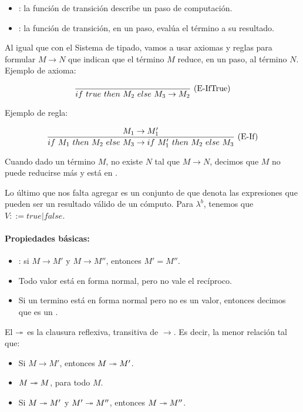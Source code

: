 \begin{itemize}
  \item {}: la función de transición describe un paso de computación.
  \item {}: la función de transición, en un paso, evalúa el término a su resultado.
\end{itemize}

Al igual que con el Sistema de tipado, vamos a usar axiomas y reglas para formular  $M\to N$ que indican que el término $M$ reduce, en un paso, al término $N$. Ejemplo de axioma:

\[\frac{}{if\ true\ then\ M_2\ else\ M_3 \to M_2}\ \text{(E-IfTrue)}\]

Ejemplo de regla:

\[\frac{M_1 \to M_1'}{if\ M_1\ then\ M_2\ else\ M_3 \to if\ M_1'\ then\ M_2\ else\ M_3}\ \text{(E-If)}\]

Cuando dado un término $M$, no existe $N$ tal que $M\to N$, decimos que $M$ no puede reducirse más y está en .

Lo último que nos falta agregar es un conjunto de  que denota las expresiones que pueden ser un resultado válido de un cómputo. Para $\lambda^b$, tenemos que $V ::= true \vert false$.

\paragraph{Propiedades básicas:}

\begin{itemize}
  \item {}: si $M \to M'$ y $M \to M''$, entonces $M'= M''$.
  \item Todo valor está en forma normal, pero no vale el recíproco.
  \item Si un termino está en forma normal pero no es un valor, entonces decimos que es un .
\end{itemize}

\noindent
El  $\twoheadrightarrow$ es la clausura reflexiva, transitiva de $\to$. Es decir, la menor relación tal que:

\begin{itemize}
  \item Si $M\to M'$, entonces $M\twoheadrightarrow M'$.
  \item $M\twoheadrightarrow M$, para todo $M$.
  \item Si $M \twoheadrightarrow M'$ y $M' \twoheadrightarrow M''$, entonces $M \twoheadrightarrow M''$.
\end{itemize}

